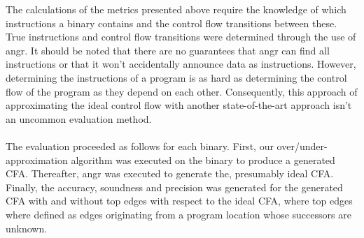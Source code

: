 \documentclass{kththesis}
\begin{document}
The calculations of the metrics presented above require the knowledge of which instructions a binary contains and the control flow transitions between these. True instructions and control flow transitions were determined through the use of angr. It should be noted that there are no guarantees that angr can find all instructions or that it won't accidentally announce data as instructions. However, determining the instructions of a program is as hard as determining the control flow of the program as they depend on each other. Consequently, this approach of approximating the ideal control flow with another state-of-the-art approach isn't an uncommon evaluation method\cite{preciseCFG}\cite{alternating}.
\\ \\
The evaluation proceeded as follows for each binary. First, our over/under-approximation algorithm was executed on the binary to produce a generated CFA. Thereafter, angr was executed to generate the, presumably ideal CFA. Finally, the accuracy, soundness and precision was generated for the generated CFA with and without top edges with respect to the ideal CFA, where top edges where defined as edges originating from a program location whose successors are unknown.

\end{document}
